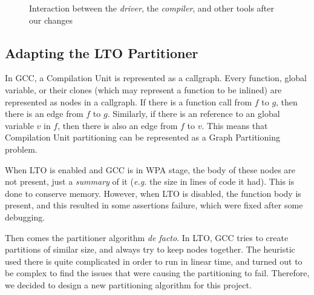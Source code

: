 \documentclass[runningheads]{llncs}
\begin{document}
\begin{figure}
{{
}
}%
\caption{Interaction between the \textit{driver}, the \textit{compiler}, and other tools
after our changes}
\label{fig:gnu_toolchain_patched}
\end{figure}

\subsection{Adapting the LTO Partitioner}\label{sec:lto_partitioner}

In GCC, a Compilation Unit is represented as a callgraph. Every function,
global variable, or their clones (which may represent a function to be inlined)
are represented as nodes in a callgraph. If there is a function call from $f$
to $g$, then there is an edge from $f$ to $g$. Similarly, if there is an
reference to an global variable $v$ in $f$, then there is also an edge from $f$
to $v$. This means that Compilation Unit partitioning can be represented as
a Graph Partitioning problem. 

When LTO is enabled and GCC is in WPA stage, the body of these nodes
are not present, just a \textit{summary} of it (\textit{e.g.} the size
in lines of code it had). This is done to conserve memory. However,
when LTO is disabled, the function body is present, and this
resulted in some assertions failure, which were fixed after some debugging.

Then comes the partitioner algorithm \textit{de facto}. In LTO, GCC tries to create
partitions of similar size, and always try to keep nodes together. The
heuristic used there is quite complicated in order to run in linear time, and turned
out to be complex to find the issues that were causing the partitioning to fail.
Therefore, we decided to design a new partitioning algorithm for this project.
\end{document}
